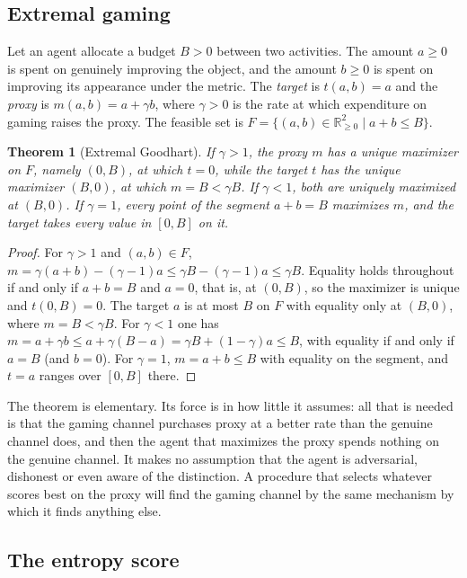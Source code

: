 \documentclass[11pt]{article}
\theoremstyle{plain}
\newtheorem{theorem}{Theorem}[section]
\theoremstyle{definition}
\theoremstyle{remark}
\newcommand{\R}{\mathbb{R}}
\begin{document}
\subsection{Extremal gaming}

Let an agent allocate a budget $B>0$ between two activities. The amount $a\ge0$ is spent on genuinely improving the object, and the amount $b\ge0$ is spent on improving its appearance under the metric. The \emph{target} is $t(a,b)=a$ and the \emph{proxy} is $m(a,b)=a+\gamma b$, where $\gamma>0$ is the rate at which expenditure on gaming raises the proxy. The feasible set is $F=\{(a,b)\in\R^2_{\ge0}\mid a+b\le B\}$.

\begin{theorem}[Extremal Goodhart]\label{thm:extremal}
If $\gamma>1$, the proxy $m$ has a unique maximizer on $F$, namely $(0,B)$, at which $t=0$, while the target $t$ has the unique maximizer $(B,0)$, at which $m=B<\gamma B$. If $\gamma<1$, both are uniquely maximized at $(B,0)$. If $\gamma=1$, every point of the segment $a+b=B$ maximizes $m$, and the target takes every value in $[0,B]$ on it.
\end{theorem}

\begin{proof}
For $\gamma>1$ and $(a,b)\in F$, $m=\gamma(a+b)-(\gamma-1)a\le\gamma B-(\gamma-1)a\le\gamma B$. Equality holds throughout if and only if $a+b=B$ and $a=0$, that is, at $(0,B)$, so the maximizer is unique and $t(0,B)=0$. The target $a$ is at most $B$ on $F$ with equality only at $(B,0)$, where $m=B<\gamma B$. For $\gamma<1$ one has $m=a+\gamma b\le a+\gamma(B-a)=\gamma B+(1-\gamma)a\le B$, with equality if and only if $a=B$ (and $b=0$). For $\gamma=1$, $m=a+b\le B$ with equality on the segment, and $t=a$ ranges over $[0,B]$ there. \qedhere
\end{proof}

The theorem is elementary. Its force is in how little it assumes: all that is needed is that the gaming channel purchases proxy at a better rate than the genuine channel does, and then the agent that maximizes the proxy spends nothing on the genuine channel. It makes no assumption that the agent is adversarial, dishonest or even aware of the distinction. A procedure that selects whatever scores best on the proxy will find the gaming channel by the same mechanism by which it finds anything else.

\subsection{The entropy score}
\end{document}
